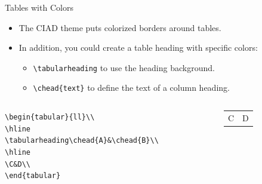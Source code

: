 \documentclass[english,sectioncirclenumberstyle]{ciadbeamer}
\begin{document}
\begin{frame}{Tables with Colors}
	\begin{itemize}
	\item The CIAD theme puts colorized borders around tables.
	\item In addition, you could create a table heading with specific colors:
		\begin{itemize}
		\item \texttt{{\textbackslash}tabularheading} to use the heading background.
		\item \texttt{{\textbackslash}chead\{text\}} to define the text of a column heading.
		\end{itemize}
	\end{itemize}
	\begin{example}
		\begin{columns}
			\begin{column}{.6\linewidth}
				\footnotesize
				\texttt{{\textbackslash}begin\{tabular\}\{{\textbar}l{\textbar}l{\textbar}\}{\textbackslash}{\textbackslash}} \\
				\texttt{{\textbackslash}hline} \\
				\texttt{{\textbackslash}tabularheading{\textbackslash}chead\{A\}\&{\textbackslash}chead\{B\}{\textbackslash}{\textbackslash}} \\
				\texttt{{\textbackslash}hline} \\
				\texttt{{\textbackslash}C\&D{\textbackslash}{\textbackslash}} \\
				\texttt{{\textbackslash}end\{tabular\}}
			\end{column}
			\begin{column}{.3\linewidth}
				\begin{tabular}{|l|l|}
					\hline
					\tabularheading\chead{A}&\chead{B} \\
					\hline
					C & D \\
					\hline
				\end{tabular}	
			\end{column}
		\end{columns}
	\end{example}
\end{frame}
\end{document}
